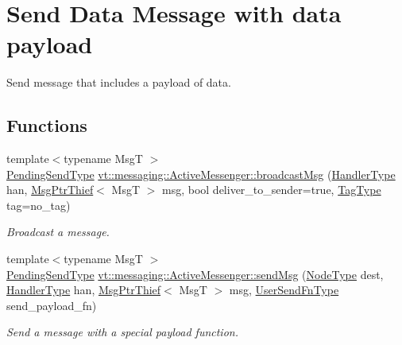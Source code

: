 \hypertarget{group__sendpayload}{}\section{Send Data Message with data payload}
\label{group__sendpayload}


Send message that includes a payload of data.  


\subsection*{Functions}
\begin{DoxyCompactItemize}
\item 
{\footnotesize template$<$typename MsgT $>$ }\\\hyperlink{structvt_1_1messaging_1_1_active_messenger_a3626a6ca76d8ad4ec7c3b47a2c70d3a8}{Pending\+Send\+Type} \hyperlink{group__sendpayload_ga9417950068f8ceed85f1b5ef53f3ad27}{vt\+::messaging\+::\+Active\+Messenger\+::broadcast\+Msg} (\hyperlink{namespacevt_af64846b57dfcaf104da3ef6967917573}{Handler\+Type} han, \hyperlink{structvt_1_1messaging_1_1_msg_ptr_thief}{Msg\+Ptr\+Thief}$<$ MsgT $>$ msg, bool deliver\+\_\+to\+\_\+sender=true, \hyperlink{namespacevt_a84ab281dae04a52a4b243d6bf62d0e52}{Tag\+Type} tag=no\+\_\+tag)
\begin{DoxyCompactList}\small\item\em Broadcast a message. \end{DoxyCompactList}\item 
{\footnotesize template$<$typename MsgT $>$ }\\\hyperlink{structvt_1_1messaging_1_1_active_messenger_a3626a6ca76d8ad4ec7c3b47a2c70d3a8}{Pending\+Send\+Type} \hyperlink{group__sendpayload_ga3548fb78b56bcd3f06cdb2fc6239e3c6}{vt\+::messaging\+::\+Active\+Messenger\+::send\+Msg} (\hyperlink{namespacevt_a866da9d0efc19c0a1ce79e9e492f47e2}{Node\+Type} dest, \hyperlink{namespacevt_af64846b57dfcaf104da3ef6967917573}{Handler\+Type} han, \hyperlink{structvt_1_1messaging_1_1_msg_ptr_thief}{Msg\+Ptr\+Thief}$<$ MsgT $>$ msg, \hyperlink{structvt_1_1messaging_1_1_active_messenger_a4b1993ad77436b6ed6c7fd32801c50ed}{User\+Send\+Fn\+Type} send\+\_\+payload\+\_\+fn)
\begin{DoxyCompactList}\small\item\em Send a message with a special payload function. \end{DoxyCompactList}\item 

\end{DoxyCompactItemize}
